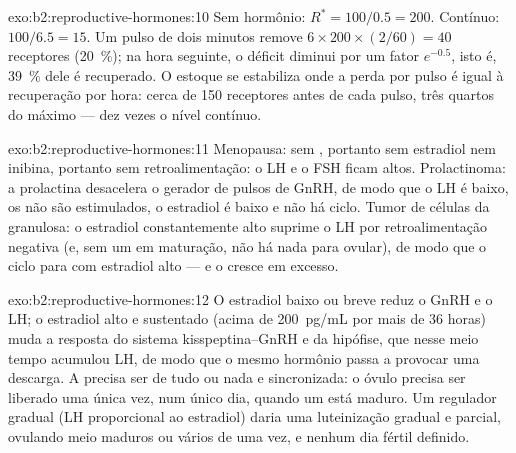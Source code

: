 \begin{solution}{exo:b2:reproductive-hormones:10}
Sem hormônio: $R^* = 100/0.5 = 200$. Contínuo: $100/6.5 = 15$. Um
pulso de dois minutos remove $6\times 200\times(2/60) = 40$ receptores
(\qty{20}{\%}); na hora seguinte, o déficit diminui por um fator
$e^{-0.5}$, isto é, \qty{39}{\%} dele é recuperado. O estoque se
estabiliza onde a perda por pulso é igual à recuperação por hora:
cerca de 150 receptores antes de cada pulso, três quartos do máximo
--- dez vezes o nível contínuo.
\end{solution}

\begin{solution}{exo:b2:reproductive-hormones:11}
Menopausa: sem , portanto sem estradiol nem inibina, portanto
sem retroalimentação: o LH e o FSH ficam altos. Prolactinoma: a
prolactina desacelera o gerador de pulsos de GnRH, de modo que o LH é
baixo, os  não são estimulados, o estradiol é baixo e não há
ciclo. Tumor de células da granulosa: o estradiol constantemente alto
suprime o LH por retroalimentação negativa (e, sem um  em
maturação, não há nada para ovular), de modo que o ciclo para com
estradiol alto --- e o  cresce em excesso.
\end{solution}

\begin{solution}{exo:b2:reproductive-hormones:12}
O estradiol baixo ou breve reduz o GnRH e o LH; o estradiol alto e
sustentado (acima de \qty{200}{pg/mL} por mais de 36 horas) muda a
resposta do sistema kisspeptina--GnRH e da hipófise, que nesse meio
tempo acumulou LH, de modo que o mesmo hormônio passa a provocar uma
descarga. A  precisa ser de tudo ou nada e sincronizada: o
óvulo precisa ser liberado uma única vez, num único dia, quando um
 está maduro. Um regulador gradual (LH proporcional ao
estradiol) daria uma luteinização gradual e parcial, 
ovulando meio maduros ou vários de uma vez, e nenhum dia fértil
definido.
\end{solution}

